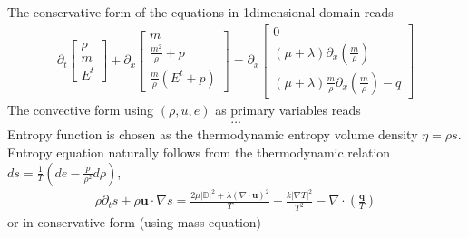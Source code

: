 \documentclass[letterpaper,10pt,english]{jupyterBook}
\begin{document}
\sphinxAtStartPar
The conservative form of the equations in 1\sphinxhyphen{}dimensional domain reads
\begin{equation*}
\begin{split}
\partial_t \begin{bmatrix} \rho \\ m \\ E^t \end{bmatrix} + 
\partial_x \begin{bmatrix} m \\ \frac{m^2}{\rho} + p \\ \frac{m}{\rho} \left( E^t + p \right) \end{bmatrix} = 
\partial_x \begin{bmatrix} 0 \\ ( \mu + \lambda ) \partial_x \left( \frac{m}{\rho} \right) \\ ( \mu + \lambda ) \frac{m}{\rho} \partial_x \left( \frac{m}{\rho} \right) - q \end{bmatrix}
\end{split}
\end{equation*}
\sphinxAtStartPar
The convective form using \((\rho, u, e)\) as primary variables reads
\begin{equation*}
\begin{split}
\dots
\end{split}
\end{equation*}
\sphinxAtStartPar
Entropy function is chosen as the thermodynamic entropy volume density \(\eta = \rho s\). Entropy equation naturally follows from the thermodynamic relation \(ds = \frac{1}{T} \left( de - \frac{p}{\rho^2} d \rho \right)\),
\begin{equation*}
\begin{split}\rho \partial_t s + \rho \mathbf{u} \cdot \nabla s = \frac{2 \mu |\mathbb{D}|^2 + \lambda (\nabla \cdot \mathbf{u})^2}{T} + \frac{k |\nabla T|^2}{T^2} - \nabla \cdot \left(\frac{\mathbf{q}}{T}\right)\end{split}
\end{equation*}
\sphinxAtStartPar
or in conservative form (using mass equation)
\end{document}
